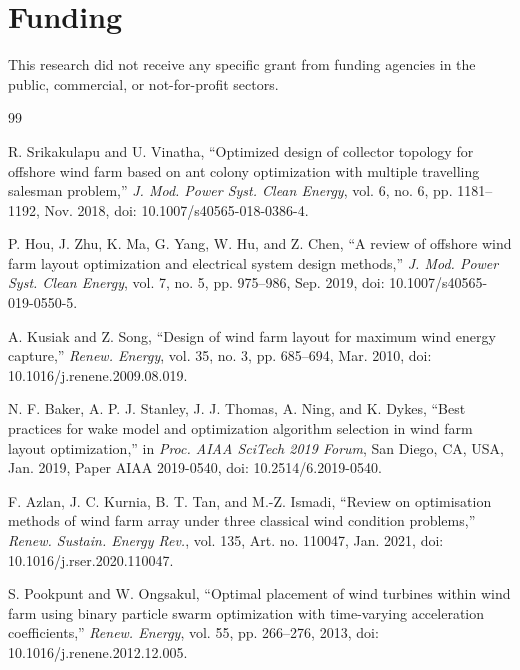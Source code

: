 \section*{Funding}
This research did not receive any specific grant from funding agencies in the public, commercial, or not-for-profit sectors.

{\footnotesize\setlength{\bibsep}{1pt plus 0.3ex}
\begin{thebibliography}{99}

R. Srikakulapu and U. Vinatha, ``Optimized design of collector topology for offshore wind farm based on ant colony optimization with multiple travelling salesman problem,'' \textit{J. Mod. Power Syst. Clean Energy}, vol. 6, no. 6, pp. 1181--1192, Nov. 2018, doi: 10.1007/s40565-018-0386-4.

P. Hou, J. Zhu, K. Ma, G. Yang, W. Hu, and Z. Chen, ``A review of offshore wind farm layout optimization and electrical system design methods,'' \textit{J. Mod. Power Syst. Clean Energy}, vol. 7, no. 5, pp. 975--986, Sep. 2019, doi: 10.1007/s40565-019-0550-5.

A. Kusiak and Z. Song, ``Design of wind farm layout for maximum wind energy capture,'' \textit{Renew. Energy}, vol. 35, no. 3, pp. 685--694, Mar. 2010, doi: 10.1016/j.renene.2009.08.019.

N. F. Baker, A. P. J. Stanley, J. J. Thomas, A. Ning, and K. Dykes, ``Best practices for wake model and optimization algorithm selection in wind farm layout optimization,'' in \textit{Proc. AIAA SciTech 2019 Forum}, San Diego, CA, USA, Jan. 2019, Paper AIAA 2019-0540, doi: 10.2514/6.2019-0540.

F. Azlan, J. C. Kurnia, B. T. Tan, and M.-Z. Ismadi, ``Review on optimisation methods of wind farm array under three classical wind condition problems,'' \textit{Renew. Sustain. Energy Rev.}, vol. 135, Art. no. 110047, Jan. 2021, doi: 10.1016/j.rser.2020.110047.

S. Pookpunt and W. Ongsakul, ``Optimal placement of wind turbines within wind farm using binary particle swarm optimization with time-varying acceleration coefficients,'' \textit{Renew. Energy}, vol. 55, pp. 266--276, 2013, doi: 10.1016/j.renene.2012.12.005.


\end{thebibliography}}
